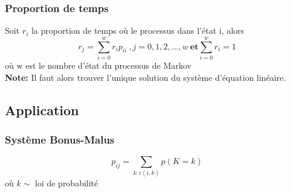 \documentclass[13pt]{article}
\begin{document}
\subsubsection*{Proportion de temps}
Soit $r_i$ la proportion de temps où le processus dans l'état i, alors 
\[ r_j = \sum_{i=0}^w r_i p_{ii}\:,j=0,1,2,...,w\: \textbf{et} \sum_{i=0}^w r_i = 1 \]
où w est le nombre d'état du processus de Markov \\
\textbf{Note:} Il faut alors trouver l'unique solution du système d'équation linéaire.


\subsection*{Application}

\subsubsection*{Système Bonus-Malus}
\[ p_{ij} = \sum_{k:c(i,k)} p(K = k) \] 
où $k \sim$ loi de probabilité 
\end{document}
